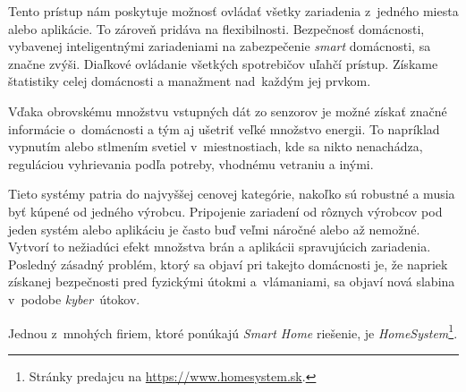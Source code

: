 Tento prístup nám poskytuje možnosť ovládať všetky zariadenia z~jedného miesta alebo aplikácie. 
To zároveň pridáva na flexibilnosti.
Bezpečnosť domácnosti, vybavenej inteligentnými zariadeniami na zabezpečenie \emph{smart} domácnosti, sa značne zvýši. 
Diaľkové ovládanie všetkých spotrebičov uľahčí prístup. 
Získame štatistiky celej domácnosti a manažment nad~každým jej prvkom.~\cite{smart_home}

Vďaka obrovskému množstvu vstupných dát zo senzorov je možné získať značné informácie o~domácnosti a tým aj ušetriť veľké množstvo energii. 
To napríklad vypnutím alebo stlmením svetiel v~miestnostiach, kde sa nikto nenachádza, reguláciou vyhrievania podľa potreby, vhodnému vetraniu a inými.

Tieto systémy patria do najvyššej cenovej kategórie, nakoľko sú robustné a musia byť kúpené od jedného výrobcu. 
Pripojenie zariadení od rôznych výrobcov pod jeden systém alebo aplikáciu je často buď veľmi náročné alebo až nemožné. 
Vytvorí to nežiadúci efekt množstva brán a aplikácii spravujúcich zariadenia. 
Posledný zásadný problém, ktorý sa objaví pri takejto domácnosti je, že napriek získanej bezpečnosti pred fyzickými útokmi a~vlámaniami, sa objaví nová slabina v~podobe \emph{kyber}~útokov.~\cite{dissmart}

Jednou z~mnohých firiem, ktoré ponúkajú \emph{Smart Home} riešenie, je \textit{HomeSystem}\footnote{Stránky predajcu na \url{https://www.homesystem.sk}.}.


